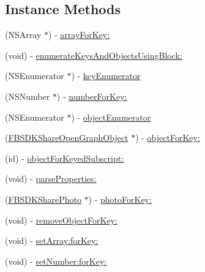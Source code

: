 \subsection*{Instance Methods}
\begin{DoxyCompactItemize}
\item 
(N\+S\+Array $\ast$) -\/ \hyperlink{protocol_f_b_s_d_k_share_open_graph_value_containing-p_a296592db96a532877e7a5cce0252bbc6}{array\+For\+Key\+:}
\item 
(void) -\/ \hyperlink{protocol_f_b_s_d_k_share_open_graph_value_containing-p_a62dbeb11b58ab43a5975f17a3ee51ce6}{enumerate\+Keys\+And\+Objects\+Using\+Block\+:}
\item 
(N\+S\+Enumerator $\ast$) -\/ \hyperlink{protocol_f_b_s_d_k_share_open_graph_value_containing-p_a80eba6494b84b59ae6c27775d3a5f81f}{key\+Enumerator}
\item 
(N\+S\+Number $\ast$) -\/ \hyperlink{protocol_f_b_s_d_k_share_open_graph_value_containing-p_a90d69b7b3128d073821f0cc8bb72a8f7}{number\+For\+Key\+:}
\item 
(N\+S\+Enumerator $\ast$) -\/ \hyperlink{protocol_f_b_s_d_k_share_open_graph_value_containing-p_aa449ffe58bd3d27792b6a59bbbc0f571}{object\+Enumerator}
\item 
(\hyperlink{interface_f_b_s_d_k_share_open_graph_object}{F\+B\+S\+D\+K\+Share\+Open\+Graph\+Object} $\ast$) -\/ \hyperlink{protocol_f_b_s_d_k_share_open_graph_value_containing-p_a1518ffed79b4dea61403b75fff4fe7d5}{object\+For\+Key\+:}
\item 
(id) -\/ \hyperlink{protocol_f_b_s_d_k_share_open_graph_value_containing-p_a2f5dd5bfdff32ca96e158518697f5b5b}{object\+For\+Keyed\+Subscript\+:}
\item 
(void) -\/ \hyperlink{protocol_f_b_s_d_k_share_open_graph_value_containing-p_a695bc758d53d5d672f6f81d3b35d784d}{parse\+Properties\+:}
\item 
(\hyperlink{interface_f_b_s_d_k_share_photo}{F\+B\+S\+D\+K\+Share\+Photo} $\ast$) -\/ \hyperlink{protocol_f_b_s_d_k_share_open_graph_value_containing-p_ae9750f9a444b9bb2d0a4f48603c903ce}{photo\+For\+Key\+:}
\item 
(void) -\/ \hyperlink{protocol_f_b_s_d_k_share_open_graph_value_containing-p_a18252524450570cb538c94abe1353f83}{remove\+Object\+For\+Key\+:}
\item 
(void) -\/ \hyperlink{protocol_f_b_s_d_k_share_open_graph_value_containing-p_a5284cc7bcdbc78c66eb45c73828879a8}{set\+Array\+:for\+Key\+:}
\item 
(void) -\/ \hyperlink{protocol_f_b_s_d_k_share_open_graph_value_containing-p_af28a24ae072bda75f06652511b9274bb}{set\+Number\+:for\+Key\+:}

\end{DoxyCompactItemize}
